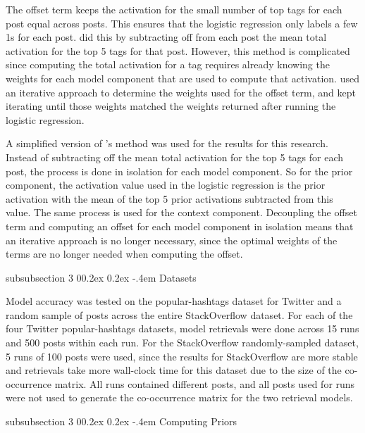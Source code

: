 \documentclass[man,floatsintext,donotrepeattitle]{apa6}
\makeatletter
\renewcommand{\subsubsection}{%
  \@startsection
  {subsubsection}%
  {3}%
  {\parindent}%
  {0\baselineskip \@plus 0.2ex \@minus 0.2ex}%
  {-.4em}%
  {\normalfont\normalsize\bfseries\addperi}}
\makeatother
\begin{document}
The offset term keeps the activation for the small number of top tags for each post equal across posts.
This ensures that the logistic regression only labels a few 1s for each post.
\textcite{Stanley2013} did this by subtracting off from each post the mean total activation for the top 5 tags for that post.
However, this method is complicated since computing the total activation for a tag requires already knowing the weights for each model component that are used to compute that activation.
\citeauthor{Stanley2013} used an iterative approach to determine the weights used for the offset term, and kept iterating until those weights matched the weights returned after running the logistic regression.

A simplified version of \citeauthor{Stanley2013}'s method was used for the results for this research.
Instead of subtracting off the mean total activation for the top 5 tags for each post, the process is done in isolation for each model component.
So for the prior component, the activation value used in the logistic regression is the prior activation with the mean of the top 5 prior activations subtracted from this value.
The same process is used for the context component.
Decoupling the offset term and computing an offset for each model component in isolation means that an iterative approach is no longer necessary,
since the optimal weights of the terms are no longer needed when computing the offset.

\subsubsection{Datasets}

Model accuracy was tested on the popular-hashtags dataset for Twitter and a random sample of posts across the entire StackOverflow dataset.
For each of the four Twitter popular-hashtags datasets, model retrievals were done across 15 runs and 500 posts within each run.
For the StackOverflow randomly-sampled dataset, 5 runs of 100 posts were used,
since the results for StackOverflow are more stable and retrievals take more wall-clock time for this dataset due to the size of the co-occurrence matrix.
All runs contained different posts, and all posts used for runs were not used to generate the co-occurrence matrix for the two retrieval models.

\subsubsection{Computing Priors}
\end{document}
